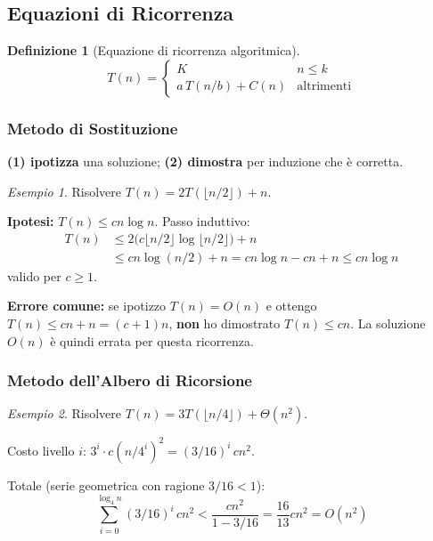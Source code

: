 \documentclass[a4paper, 11pt]{article}
\theoremstyle{definition}
\newtheorem{definizione}{Definizione}[section]
\theoremstyle{remark}
\newtheorem{esempio}{Esempio}[section]
\theoremstyle{remark}
\begin{document}
	\subsection{Equazioni di Ricorrenza}
	
	\begin{definizione}[Equazione di ricorrenza algoritmica]
		\[
		T(n) =
		\begin{cases}
			K             & n \le k \\
			a\,T(n/b)+C(n)& \text{altrimenti}
		\end{cases}
		\]
	\end{definizione}
	
	\subsubsection{Metodo di Sostituzione}
	
	\begin{softnote}
		\textbf{(1) ipotizza} una soluzione; \textbf{(2) dimostra}
		per induzione che è corretta.
	\end{softnote}
	
	\begin{esempio}
		Risolvere $T(n) = 2T\!\left(\lfloor n/2 \rfloor\right) + n$.
		
		\textbf{Ipotesi:} $T(n) \le cn\log n$. Passo induttivo:
		\begin{align*}
			T(n) &\le 2\bigl(c\lfloor n/2\rfloor \log\lfloor n/2\rfloor\bigr) + n \\
			&\le cn\log(n/2) + n = cn\log n - cn + n \le cn\log n
		\end{align*}
		valido per $c \ge 1$. \checkmark
	\end{esempio}
	
	\begin{hardnote}
		\textbf{Errore comune:} se ipotizzo $T(n) = O(n)$ e ottengo
		$T(n) \le cn + n = (c+1)n$, \textbf{non} ho dimostrato $T(n) \le cn$.
		La soluzione $O(n)$ è quindi errata per questa ricorrenza.
	\end{hardnote}
	
	\subsubsection{Metodo dell'Albero di Ricorsione}
	
	\begin{esempio}
		Risolvere $T(n) = 3T(\lfloor n/4 \rfloor) + \Theta(n^2)$.
		
		Costo livello $i$: $3^i \cdot c(n/4^i)^2 = (3/16)^i\,cn^2$.
		
		Totale (serie geometrica con ragione $3/16 < 1$):
		\[
		\sum_{i=0}^{\log_4 n}(3/16)^i\,cn^2
		< \frac{cn^2}{1-3/16} = \frac{16}{13}cn^2 = O(n^2)
		\]
	\end{esempio}
	
\end{document}
